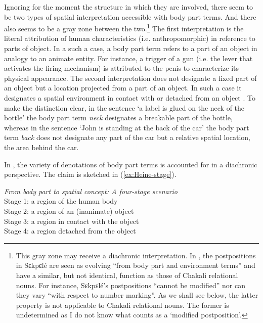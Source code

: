 Ignoring for the moment the structure in which they are involved, there seem to
be two types
of spatial interpretation accessible with body part terms. And there also seems
to be a gray zone between the two.\footnote{This gray zone may receive a
diachronic interpretation.  In
\citet[1072]{Amek07c},  the postpositions in Sɛkpɛlé are seen as evolving
``from body part and environment terms''  and have a similar, but not
identical, 
function as those of Chakali relational nouns. For instance, Sɛkpɛlé's  
postpositions ``cannot be modified'' nor can they vary ``with respect to number
 marking''.  As we shall see below, the latter property is not applicable to
Chakali relational nouns. The former is undetermined as I do not know what
counts as a `modified postposition'.} The first interpretation is the literal
attribution of human
characteristics (i.e. anthropomorphic) in  reference to parts of object. In a
such a
case, a body part term refers to a part of an object in analogy to an animate
entity. For instance, a trigger of a gun (i.e. the lever that activates the
firing
mechanism) is  attributed to the penis to characterize its physical appearance.
The
second interpretation does not designate a fixed part of an object
but a location projected from a part of an object.  In such a case it designates
a spatial environment in contact with or detached from an object
\citep[44]{Hein97}. To make the
distinction clear,  in the sentence `a label is glued on the neck of the bottle'
the body part term {\it neck} designates a breakable part of the bottle, whereas
in the sentence `John is standing at the back of the car' the body part term
{\it back} does not designate any part of the car but a relative spatial
location, the area behind the car. 


 In \citet[44]{Hein97}, the variety of denotations of body part terms is
accounted for in a diachronic perspective. The  claim is sketched in
(\ref{ex:Heine-stage}).


\begin{exe}
\ex\label{ex:Heine-stage}{\it From body part to spatial concept: A four-stage
scenario \citep[44]{Hein97}}\\
Stage 1: a region of the human body\\
Stage 2: a region of an (inanimate) object\\
Stage 3: a region in contact with the object\\ 
Stage 4:  a region detached from the object\\
\end{exe}


